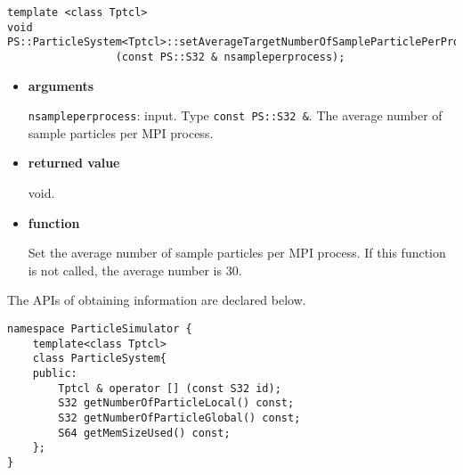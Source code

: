 
\begin{screen}
\begin{verbatim}
template <class Tptcl>
void PS::ParticleSystem<Tptcl>::setAverageTargetNumberOfSampleParticlePerProcess
                 (const PS::S32 & nsampleperprocess);
\end{verbatim}
\end{screen}

\begin{itemize}

\item {\bf arguments}

{\tt nsampleperprocess}: input. Type {\tt const PS::S32 \&}. The
average number of sample particles per MPI process.


\item {\bf returned value}

void.

\item {\bf function}

Set the average number of sample particles per MPI process. If this
function is not called, the average number is 30.


\end{itemize}



The APIs of obtaining information are declared below.

\begin{lstlisting}[caption=ParticleSystem2]
namespace ParticleSimulator {
    template<class Tptcl>
    class ParticleSystem{
    public:
        Tptcl & operator [] (const S32 id);
        S32 getNumberOfParticleLocal() const;
        S32 getNumberOfParticleGlobal() const;
        S64 getMemSizeUsed() const;
    };
}
\end{lstlisting}

